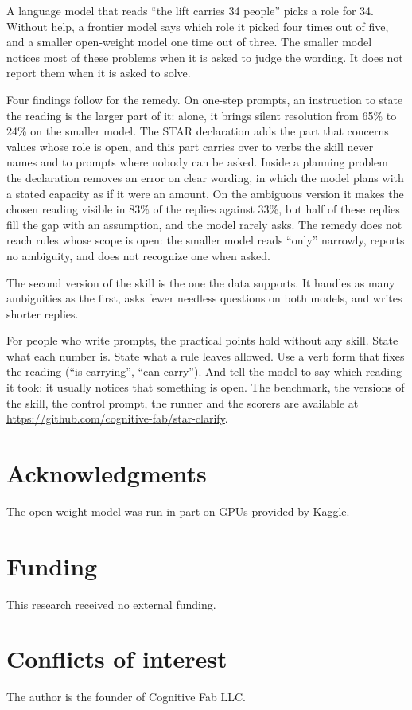 \documentclass[11pt,a4paper]{article}
\begin{document}
A language model that reads ``the lift carries 34 people'' picks a role for
34. Without help, a frontier model says which role it picked four times out
of five, and a smaller open-weight model one time out of three. The
smaller model notices most of these problems when it is asked to judge
the wording. It does not report them when it is asked to solve.

Four findings follow for the remedy. On one-step prompts, an instruction
to state the reading is the larger part of it: alone, it brings silent
resolution from 65\% to 24\% on the smaller model. The STAR declaration
adds the part that concerns values whose role is open, and this part
carries over to verbs the skill never names and to prompts where nobody
can be asked. Inside a planning problem the declaration removes an error on clear
wording, in which the model plans with a stated capacity as if it were
an amount. On the ambiguous version it makes the chosen reading visible
in 83\% of the replies against 33\%, but half of these replies fill
the gap with an assumption, and the model rarely asks. The remedy does not reach rules whose scope is open:
the smaller model reads ``only'' narrowly, reports no ambiguity, and does
not recognize one when asked.

The second version of the skill is the one the data supports. It handles
as many ambiguities as the first, asks fewer needless questions on both
models, and writes shorter replies.

For people who write prompts, the practical points hold without any
skill. State what each number is. State what a rule leaves allowed. Use a
verb form that fixes the reading (``is carrying'', ``can carry''). And
tell the model to say which reading it took: it usually notices that
something is open. The benchmark, the versions of the skill, the control
prompt, the runner and the scorers are available at
\url{https://github.com/cognitive-fab/star-clarify}.

\section*{Acknowledgments}
The open-weight model was run in part on GPUs provided by Kaggle.

\section*{Funding}
This research received no external funding.

\section*{Conflicts of interest}
The author is the founder of Cognitive Fab LLC.
\end{document}
